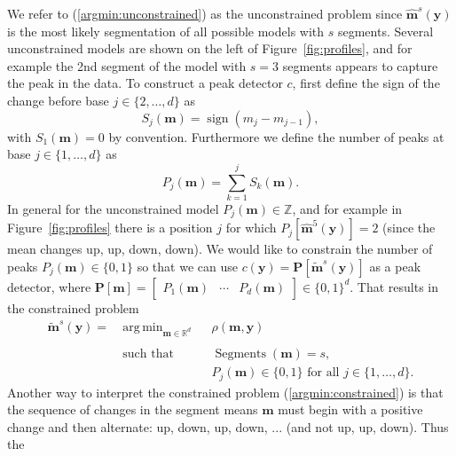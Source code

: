 \documentclass{article}
\DeclareMathOperator*{\argmin}{arg\,min}
\DeclareMathOperator*{\sign}{sign}
\DeclareMathOperator*{\Lik}{Lik}
\DeclareMathOperator*{\Segments}{Segments}
\newcommand{\ZZ}{\mathbb Z}
\newcommand{\RR}{\mathbb R}
\begin{document}
We refer to (\ref{argmin:unconstrained}) as the unconstrained problem
since $\mathbf{\hat m}^s(\mathbf y)$ is the most likely segmentation
of all possible models with $s$ segments. Several unconstrained models
are shown on the left of Figure~\ref{fig:profiles}, and for example
the 2nd segment of the model with $s=3$ segments appears to capture
the peak in the data. 
To construct a peak detector $c$, first define the sign of the change
before base $j\in\{2, \dots, d\}$ as
\begin{equation}
  \label{eq:sign}
  S_j(\mathbf m) = \sign( m_{j} - m_{j-1} ),
\end{equation}
with $S_1(\mathbf m)=0$ by convention. Furthermore we define the number
of peaks at base $j\in\{1, \dots, d\}$ as
\begin{equation}
  \label{eq:peaks}
  P_j(\mathbf m) = \sum_{k=1}^j S_k(\mathbf m).
\end{equation}
In general for the unconstrained model $P_j(\mathbf m)\in\ZZ$, and for
example in Figure~\ref{fig:profiles} there is a position $j$ for which
$P_j\left[ \mathbf{\hat m}^5(\mathbf y) \right]=2$ (since the mean
changes up, up, down, down). We would like to constrain the number of
peaks $P_j(\mathbf m)\in\{0, 1\}$ so that we can use $c(\mathbf y) =
\mathbf P\left[ \mathbf{\tilde m}^s(\mathbf y) \right]$ as a peak
detector, where $\mathbf P[\mathbf m] = \left[\begin{array}{ccc}
    P_1(\mathbf m) & \cdots & P_d(\mathbf m)
\end{array}\right]\in\{0, 1\}^d$. That results 
in the constrained problem
\begin{equation}
  \label{argmin:constrained}
  \begin{aligned}
    \mathbf{\tilde m}^s(\mathbf y)  =\ 
    &\argmin_{\mathbf m\in\RR^{d}} && 
    \rho
    (\mathbf m, \mathbf y) \\
    \\
    &\text{such that} && \Segments(\mathbf m)=s,\\
    &&& P_j(\mathbf m) \in\{0, 1\} \text{ for all } j\in\{1, \dots, d\}.
  \end{aligned}
\end{equation}
Another way to interpret the constrained problem
(\ref{argmin:constrained}) is that the sequence of changes in the
segment means $\mathbf m$ must begin with a positive change and then
alternate: up, down, up, down, ... (and not up, up, down). Thus the
\end{document}
